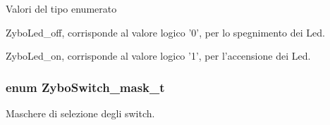 \begin{Desc}
\item[Valori del tipo enumerato]\par
\begin{description}
\item[{\em 
\hypertarget{group___zybo_gga3dcb274f22e577705c49944b8d1f4b12a9679f1c302afdb51915a2331b4ec92f3}{Zybo\+Led\+\_\+off}\label{group___zybo_gga3dcb274f22e577705c49944b8d1f4b12a9679f1c302afdb51915a2331b4ec92f3}
}]Zybo\+Led\+\_\+off, corrisponde al valore logico '0', per lo spegnimento dei Led. \item[{\em 
\hypertarget{group___zybo_gga3dcb274f22e577705c49944b8d1f4b12aafcf0ae16a6edec807c06bb0a99f7e8b}{Zybo\+Led\+\_\+on}\label{group___zybo_gga3dcb274f22e577705c49944b8d1f4b12aafcf0ae16a6edec807c06bb0a99f7e8b}
}]Zybo\+Led\+\_\+on, corrisponde al valore logico '1', per l'accensione dei Led. \end{description}
\end{Desc}
\hypertarget{group___zybo_ga2e0602a824354f25c395f938caba3703}{
\subsubsection[{Zybo\+Switch\+\_\+mask\+\_\+t}]{\setlength{\rightskip}{0pt plus 5cm}enum {\bf Zybo\+Switch\+\_\+mask\+\_\+t}}}\label{group___zybo_ga2e0602a824354f25c395f938caba3703}


Maschere di selezione degli switch. 

